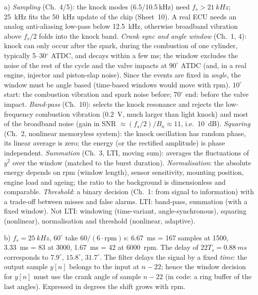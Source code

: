 \begin{solution}
a) \emph{Sampling} (Ch.~4/5): the knock modes (6.5/10.5\,kHz) need $f_s>\SI{21}{kHz}$;
\SI{25}{kHz} fits the \SI{50}{kHz} update of the chip (Sheet~10). A real ECU needs an
analog anti-aliasing low-pass below \SI{12.5}{kHz}, otherwise broadband vibration above
$f_s/2$ folds into the knock band.
\emph{Crank sync and angle window} (Ch.~1, 4): knock can only occur after the spark,
during the combustion of one cylinder, typically 5--30$^\circ$ ATDC, and decays within
a few ms; the window excludes the noise of the rest of the cycle and the valve impacts
at $90^\circ$ ATDC (and, in a real engine, injector and piston-slap noise). Since the
events are fixed in \emph{angle}, the window must be angle based (time-based windows
would move with rpm). $10^\circ$ start: the combustion vibration and spark noise before;
$70^\circ$ end: before the valve impact.
\emph{Band-pass} (Ch.~10): selects the knock resonance and rejects the low-frequency
combustion vibration (\SI{0.2}{V}, much larger than light knock) and most of the
broadband noise (gain in SNR $\approx (f_s/2)/B_n\approx 11$, i.e.\ \SI{10}{dB}).
\emph{Squaring} (Ch.~2, nonlinear memoryless system): the knock oscillation has
random phase, its linear average is zero; the energy (or the rectified amplitude) is
phase independent. \emph{Summation} (Ch.~3, LTI, moving sum): averages the fluctuations
of $y^2$ over the window (matched to the burst duration).
\emph{Normalisation}: the absolute energy depends on rpm (window length), sensor
sensitivity, mounting position, engine load and ageing; the ratio to the background is
dimensionless and comparable. \emph{Threshold}: a binary decision (Ch.~1: from signal to
information) with a trade-off between misses and false alarms.
LTI: band-pass, summation (with a fixed window). Not LTI: windowing (time-variant,
angle-synchronous), squaring (nonlinear), normalisation and threshold (nonlinear,
adaptive).

b) $f_s=\SI{25}{kHz}$, $60^\circ$ take $60/(6\cdot\text{rpm})$\,s:
\SI{6.67}{ms} = 167 samples at 1500, \SI{3.33}{ms} = 83 at 3000, \SI{1.67}{ms} = 42 at
\SI{6000}{rpm}. The delay of $22T_s=\SI{0.88}{ms}$ corresponds to
$7.9^\circ$, $15.8^\circ$, $31.7^\circ$. The filter delays the signal by a fixed
\emph{time}: the output sample $y[n]$ belongs to the input at $n-22$; hence the window
decision for $y[n]$ must use the crank angle of sample $n-22$ (in code: a ring buffer of
the last angles). Expressed in degrees the shift grows with rpm.


\end{solution}
